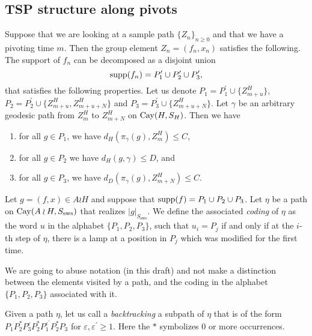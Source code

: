 \subsection{TSP structure along pivots}

\begin{prop}\label{prop: structure along pivots}
	Suppose that we are looking at a sample path $\{Z_n\}_{n\ge 0}$ and that we have a pivoting time $m$. Then the group element $Z_n=(f_n,x_n)$ satisfies the following. The support of $f_n$ can be decomposed as a disjoint union
	\[\mathrm{supp}(f_n)=P^{\prime}_1\cup P^{\prime}_2\cup P^{\prime}_3,\]
	that satisfies the following properties. Let us denote $P_1=P^{\prime}_1\cup\{Z^{H}_{m+u}\}$, $P_2=P^{\prime}_2\cup \{Z^{H}_{m+u}, Z^{H}_{m+u+N}\}$ and  $P_3=P^{\prime}_3\cup \{Z^{H}_{m+u+N}\}$. Let  $\gamma$ be an arbitrary geodesic path from $Z_m^{H}$ to $Z^{H}_{m+N}$ on $\mathrm{Cay}(H,S_H)$. Then we have
	\begin{enumerate}
		\item for all $g\in P_1$, we have $d_H\left( \pi_{\gamma}(g) ,Z_m^H  \right)\le C$,
		\item for all $g\in P_2$ we have $d_H(g,\gamma)\le D$, and
		\item for all $g\in P_3$, we have $d_D\left( \pi_{\gamma}(g),Z^H_{m+N} \right)\le C$.
	\end{enumerate}
\end{prop}


\begin{defin}
	 Let $g=(f,x)\in A\wr H$ and suppose that $\mathrm{supp}(f)=P_1\cup P_2\cup P_3$. Let $\eta$ be a path on $\mathrm{Cay}(A\wr H,S_{\mathrm{sws}})$ that realizes $|g|_{S_{\mathrm{sws}}}$. We define the associated \emph{coding} of $\eta$ as the word $u$ in the alphabet $\{P_1,P_2,P_3\}$, such that $u_i=P_j$ if and only if at the $i$-th step of $\eta$, there is a lamp at a position in $P_j$ which was modified for the first time.
\end{defin}

We are going to abuse notation (in this draft) and not make a distinction between the elements visited by a path, and the coding in the alphabet $\{P_1,P_2,P_3\}$ associated with it.
\begin{defin}
	Given a path $\eta$, let us call a \emph{backtracking} a subpath of $\eta$ that is of the form $P_1P_2^{*}P_3^{\varepsilon}P_2^{*}P_1^{\varepsilon^{\prime}}P_2^{*}P_3$ for $\varepsilon, \varepsilon^{\prime}\ge 1$. Here the $*$ symbolizes $0$ or more occurrences.
\end{defin}

